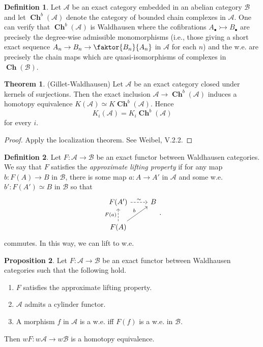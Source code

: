 \documentclass[10pt,letterpaper,cm]{nupset}
\theoremstyle{definition}
\newtheorem{definition}{Definition}
\theoremstyle{theorem}
\newtheorem{theorem}{Theorem}
\newtheorem{prop}[theorem]{Proposition}
\theoremstyle{remark}
\newcommand{\1}{\mathbf{1}}
\renewcommand{\a}{\mathscr{A}}
\renewcommand{\b}{\mathscr{B}}
\newcommand{\0}{\vec 0}
\DeclareMathOperator{\ch}{\mathbf{Ch}}
\begin{document}
\begin{definition}
Let $\a$ be an exact category embedded in an abelian category $\b$ and let $\ch^b(\a)$ denote the category of bounded chain complexes in $\a$. One can verify that $\ch^b(\a)$ is Waldhausen where the cofibrations $A_{\bullet} \rightarrowtail B_{\bullet}$ are precisely the degree-wise admissible monomorphisms (i.e., those giving a short exact sequence $A_n \to B_n \to \faktor{B_n}{A_n}$ in $\a$ for each $n$) and the w.e. are precisely the chain maps which are quasi-isomorphisms of complexes in $\ch(\b)$.
\end{definition}

\begin{theorem}{(Gillet-Waldhausen)}
Let $\a$ be an exact category closed under kernels of surjections. Then the exact inclusion $\a \to \ch^b(\a)$ induces a homotopy equivalence $K(\a) \simeq K\ch^b(\a)$. Hence $$K_i(\a) = K_i \ch^b(\a)$$ for every $i$.
\end{theorem}
\begin{proof}
Apply the localization theorem. See Weibel, V.2.2.
\end{proof}

\begin{definition}
Let $F: \a \to \b$ be an exact functor between Waldhausen categories. We say that $F$ satisfies the \textit{approximate lifting property} if for any map $b: F(A) \to B$ in $\b$, there is some map $a : A \to A'$ in $\a$ and some w.e. $b' : F(A') \simeq B$ in $\b$ so that
\[
\begin{tikzcd}
F(A') \arrow[r, "\sim", dashed] & B \\
F(A) \arrow[u, "F(a)", dashed] \arrow[ru, "b"] & 
\end{tikzcd}.
\]
commutes. In this way, we can lift to w.e.
\end{definition}

\begin{prop}
Let $F: \a \to \b$ be an exact functor between Waldhausen categories such that the following hold.
\begin{enumerate}
\item $F$ satisfies the approximate lifting property.
\item $\a$ admits a cylinder functor.
\item A morphism $f$ in $\a$ is a w.e. iff $F(f)$ is a w.e. in $\b$.
\end{enumerate}
Then $wF : w \a \to w\b$ is a homotopy equivalence.
\end{prop}
\end{document}
